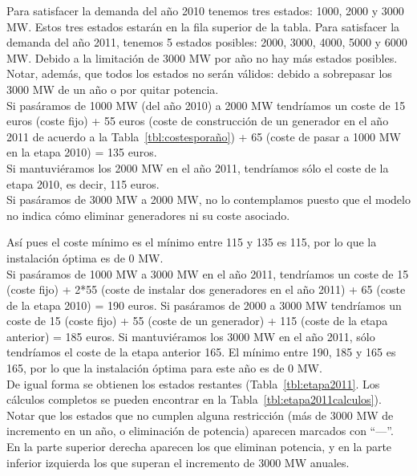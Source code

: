 \documentclass[12pt,a4paper,twoside,openright,titlepage,final]{article}
\begin{document}
Para satisfacer la demanda del año 2010 tenemos tres estados: 1000, 2000 y 3000 MW. Estos tres estados estarán en la fila superior de la tabla. Para satisfacer la demanda del año 2011, tenemos 5 estados posibles: 2000, 3000, 4000, 5000 y 6000 MW. Debido a la limitación de 3000 MW por año no hay más estados posibles. Notar, además, que todos los estados no serán válidos: debido a sobrepasar los 3000 MW de un año o por quitar potencia.\\

Si pasáramos de 1000 MW (del año 2010) a 2000 MW tendríamos un coste de 15 euros (coste fijo) + 55 euros (coste de construcción de un generador en el año 2011 de acuerdo a la Tabla~\ref{tbl:costesporaño}) + 65 (coste de pasar a 1000 MW en la etapa 2010) = 135 euros.\\

Si mantuviéramos los 2000 MW en el año 2011, tendríamos sólo el coste de la etapa 2010, es decir, 115 euros.\\

Si pasáramos de 3000 MW a 2000 MW, no lo contemplamos puesto que el modelo no indica cómo eliminar generadores ni su coste asociado.

Así pues el coste mínimo es el mínimo entre 115 y 135 es 115, por lo que la instalación óptima es de 0 MW.\\

Si pasáramos de 1000 MW a 3000 MW en el año 2011, tendríamos un coste de 15 (coste fijo) + 2*55 (coste de instalar dos generadores en el año 2011) + 65 (coste de la etapa 2010) = 190 euros. Si pasáramos de 2000 a 3000 MW tendríamos un coste de 15 (coste fijo) + 55 (coste de un generador) + 115 (coste de la etapa anterior) = 185 euros. Si mantuviéramos los 3000 MW en el año 2011, sólo tendríamos el coste de la etapa anterior 165. El mínimo entre 190, 185 y 165 es 165, por lo que la instalación óptima para este año es de 0 MW.\\

De igual forma se obtienen los estados restantes (Tabla~\ref{tbl:etapa2011}. Los cálculos completos se pueden encontrar en la Tabla~\ref{tbl:etapa2011calculos}). Notar que los estados que no cumplen alguna restricción (más de 3000 MW de incremento en un año, o eliminación de potencia) aparecen marcados con ``---''. En la parte superior derecha aparecen los que eliminan potencia, y en la parte inferior izquierda los que superan el incremento de 3000 MW anuales.\\  
\end{document}
